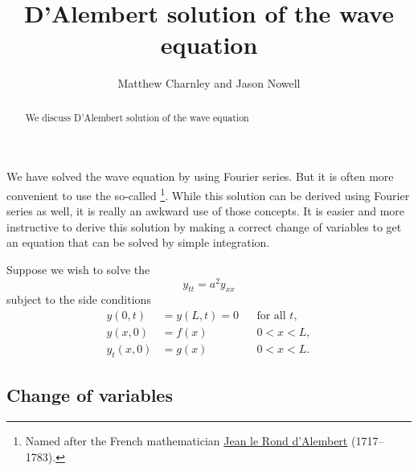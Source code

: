 \documentclass{ximera}
\title{D'Alembert solution of the wave equation}
\author{Matthew Charnley and Jason Nowell}
\begin{document}
\begin{abstract}
    We discuss D'Alembert solution of the wave equation
\end{abstract}
\maketitle

\label{dalemb:section}




We have solved the wave equation by using Fourier series.  But it is often more convenient to use the so-called \emph{}%
\footnote{
    Named after the French mathematician \href{https://en.wikipedia.org/wiki/D\%27Alembert}{Jean le Rond d'Alembert} (1717--1783).
    }.
While this solution can be derived using Fourier series as well, it is really an awkward use of those concepts.  It is easier and more instructive to derive this solution by making a correct change of variables to get an equation that can be solved by simple integration.

Suppose we wish to solve the 
\begin{equation} \label{dalemb:weq}
    y_{tt} = a^2 y_{xx}
\end{equation}
subject to the side conditions
\begin{equation} \label{dalemb:weqside}
    \begin{aligned}
        y(0,t) &=  y(L,t) = 0 & & \text{for all } t , \\
        y(x,0) &= f(x) &  & 0 < x < L , \\
        y_t(x,0) &= g(x) &  & 0 < x < L .
    \end{aligned}
\end{equation}

\subsection{Change of variables}
\end{document}
